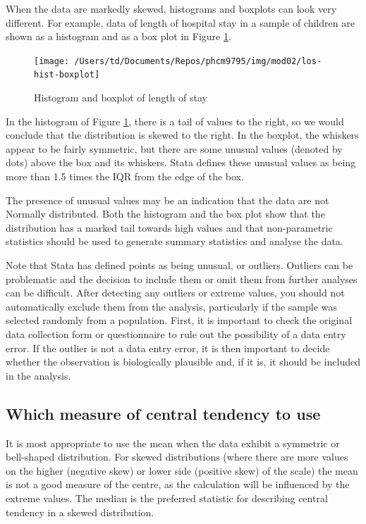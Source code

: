 \documentclass[
]{memoir}
\begin{document}
When the data are markedly skewed, histograms and boxplots can look very different. For example, data of length of hospital stay in a sample of children are shown as a histogram and as a box plot in Figure \ref{fig:fig-2-7}.

\begin{figure}
\texttt{[image: /Users/td/Documents/Repos/phcm9795/img/mod02/los-hist-boxplot]} \caption{Histogram and boxplot of length of stay}\label{fig:fig-2-7}
\end{figure}

In the histogram of Figure \ref{fig:fig-2-7}, there is a tail of values to the right, so we would conclude that the distribution is skewed to the right. In the boxplot, the whiskers appear to be fairly symmetric, but there are some unusual values (denoted by dots) above the box and its whiskers. Stata defines these unusual values as being more than 1.5 times the IQR from the edge of the box.

The presence of unusual values may be an indication that the data are not Normally distributed. Both the histogram and the box plot show that the distribution has a marked tail towards high values and that non-parametric statistics should be used to generate summary statistics and analyse the data.

Note that Stata has defined points as being unusual, or outliers. Outliers can be problematic and the decision to include them or omit them from further analyses can be difficult. After detecting any outliers or extreme values, you should not automatically exclude them from the analysis, particularly if the sample was selected randomly from a population. First, it is important to check the original data collection form or questionnaire to rule out the possibility of a data entry error. If the outlier is not a data entry error, it is then important to decide whether the observation is biologically plausible and, if it is, it should be included in the analysis.

\hypertarget{which-measure-of-central-tendency-to-use}{%
\subsection{Which measure of central tendency to use}\label{which-measure-of-central-tendency-to-use}}

It is most appropriate to use the mean when the data exhibit a symmetric or bell-shaped distribution. For skewed distributions (where there are more values on the higher (negative skew) or lower side (positive skew) of the scale) the mean is not a good measure of the centre, as the calculation will be influenced by the extreme values. The median is the preferred statistic for describing central tendency in a skewed distribution.
\end{document}
